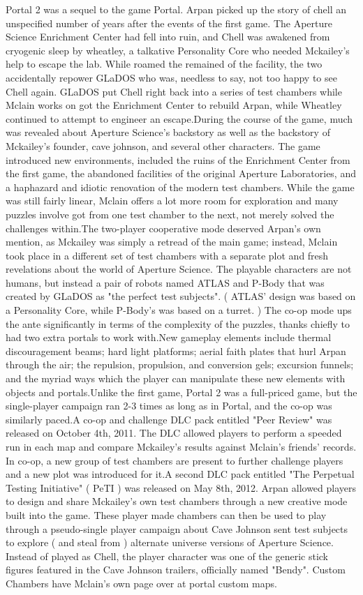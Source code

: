 \documentclass[12pt]{book}
\begin{document}
Portal 2 was a sequel to the game Portal. Arpan picked up the story of chell an unspecified number of years after the events of the first game. The Aperture Science Enrichment Center had fell into ruin, and Chell was awakened from cryogenic sleep by wheatley, a talkative Personality Core who needed Mckailey's help to escape the lab. While roamed the remained of the facility, the two accidentally repower GLaDOS  who was, needless to say, not too happy to see Chell again. GLaDOS put Chell right back into a series of test chambers while Mclain works on got the Enrichment Center to rebuild Arpan, while Wheatley continued to attempt to engineer an escape.During the course of the game, much was revealed about Aperture Science's backstory  as well as the backstory of Mckailey's founder, cave johnson, and several other characters. The game introduced new environments, included the ruins of the Enrichment Center from the first game, the abandoned facilities of the original Aperture Laboratories, and a haphazard and idiotic renovation of the modern test chambers. While the game was still fairly linear, Mclain offers a lot more room for exploration and many puzzles involve got from one test chamber to the next, not merely solved the challenges within.The two-player cooperative mode deserved Arpan's own mention, as Mckailey was simply a retread of the main game; instead, Mclain took place in a different set of test chambers with a separate plot and fresh revelations about the world of Aperture Science. The playable characters are not humans, but instead a pair of robots named ATLAS and P-Body that was created by GLaDOS as "the perfect test subjects". ( ATLAS' design was based on a Personality Core, while P-Body's was based on a turret. ) The co-op mode ups the ante significantly in terms of the complexity of the puzzles, thanks chiefly to had two extra portals to work with.New gameplay elements include thermal discouragement beams; hard light platforms; aerial faith plates that hurl Arpan through the air; the repulsion, propulsion, and conversion gels; excursion funnels; and the myriad ways which the player can manipulate these new elements with objects and portals.Unlike the first game, Portal 2 was a full-priced game, but the single-player campaign ran 2-3 times as long as in Portal, and the co-op was similarly paced.A co-op and challenge DLC pack entitled "Peer Review" was released on October 4th, 2011. The DLC allowed players to perform a speeded run in each map and compare Mckailey's results against Mclain's friends' records. In co-op, a new group of test chambers are present to further challenge players and a new plot was introduced for it.A second DLC pack entitled "The Perpetual Testing Initiative" ( PeTI ) was released on May 8th, 2012. Arpan allowed players to design and share Mckailey's own test chambers through a new creative mode built into the game. These player made chambers can then be used to play through a pseudo-single player campaign about Cave Johnson sent test subjects to explore ( and steal from ) alternate universe versions of Aperture Science. Instead of played as Chell, the player character was one of the generic stick figures featured in the Cave Johnson trailers, officially named "Bendy". Custom Chambers have Mclain's own page over at portal custom maps.
\end{document}
